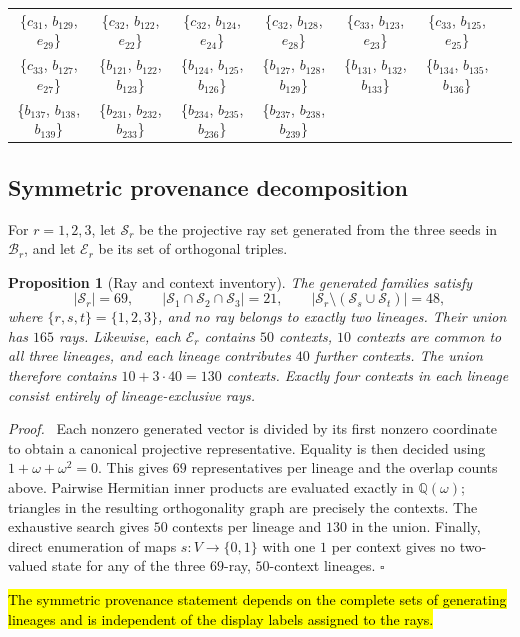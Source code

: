 \documentclass[%
  reprint,
  superscriptaddress,
  showpacs,
  showkeys,
  amsmath,amssymb,
  pra,
  longbibliography,
  floatfix,
  x11names
]{revtex4-2}
\newenvironment{revision}{\begingroup}{\endgroup}
\newcommand{\corr}[1]{{\color{red}\hl{#1}}}
\newtheorem{proposition}{Proposition}
\newenvironment{proof}{\par\noindent\textit{Proof.}\ }{\hfill$\square$\par}
\begin{document}
\begin{table}[htbp!]
\begin{ruledtabular}
\begin{tabular}{ccccccc}
\{$c_{31}$, $b_{129}$, $e_{29}$\} & \{$c_{32}$, $b_{122}$, $e_{22}$\} & \{$c_{32}$, $b_{124}$, $e_{24}$\} & \{$c_{32}$, $b_{128}$, $e_{28}$\} & \{$c_{33}$, $b_{123}$, $e_{23}$\} & \{$c_{33}$, $b_{125}$, $e_{25}$\} \\
\{$c_{33}$, $b_{127}$, $e_{27}$\} & \{$b_{121}$, $b_{122}$, $b_{123}$\} & \{$b_{124}$, $b_{125}$, $b_{126}$\} & \{$b_{127}$, $b_{128}$, $b_{129}$\} & \{$b_{131}$, $b_{132}$, $b_{133}$\} & \{$b_{134}$, $b_{135}$, $b_{136}$\} \\
\{$b_{137}$, $b_{138}$, $b_{139}$\} & \{$b_{231}$, $b_{232}$, $b_{233}$\} & \{$b_{234}$, $b_{235}$, $b_{236}$\} & \{$b_{237}$, $b_{238}$, $b_{239}$\} & & \\
\end{tabular}
\end{ruledtabular}
\end{table}

\begin{revision}
\subsection{Symmetric provenance decomposition}

For $r=1,2,3$, let $\mathcal{S}_r$ be the projective ray set generated from the three seeds in $\mathcal{B}_r$, and let $\mathcal{E}_r$ be its set of orthogonal triples.

\begin{proposition}[Ray and context inventory]
\label{prop:provenance}
The generated families satisfy
\[
|\mathcal{S}_r|=69,\qquad
|\mathcal{S}_1\cap\mathcal{S}_2\cap\mathcal{S}_3|=21,
\qquad |\mathcal{S}_r\setminus(\mathcal{S}_s\cup\mathcal{S}_t)|=48,
\]
where $\{r,s,t\}=\{1,2,3\}$, and no ray belongs to exactly two lineages.  Their union has $165$
rays.  Likewise, each $\mathcal{E}_r$ contains $50$ contexts, $10$ contexts are common to all three lineages, and each lineage contributes $40$ further contexts.  The union therefore contains $10+3\cdot40=130$ contexts.  Exactly four contexts in each lineage consist entirely of lineage-exclusive rays.
\end{proposition}

\begin{proof}
Each nonzero generated vector is divided by its first nonzero coordinate to obtain a canonical projective representative.  Equality is then decided using $1+\omega+\omega^2=0$.  This gives $69$ representatives per lineage and the overlap counts above.  Pairwise Hermitian inner products are evaluated exactly in $\mathbb{Q}(\omega)$; triangles in the resulting orthogonality graph are precisely the contexts.  The exhaustive search gives $50$ contexts per lineage and $130$ in the union.  Finally, direct enumeration of maps $s:V\to\{0,1\}$ with one $1$ per context gives no two-valued state for any of the three $69$-ray, $50$-context lineages.
\end{proof}

\corr{The symmetric provenance statement depends on the complete sets of generating lineages and is independent of the display labels assigned to the rays.}
\end{revision}
\end{document}
